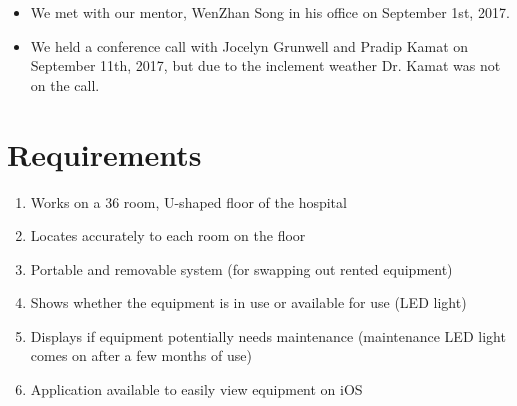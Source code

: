 \documentclass[12pt]{article}
\begin{document}
		\begin{itemize}
			\item We met with our mentor, WenZhan Song in his office on September 1st, 2017.\\
			\item We held a conference call with Jocelyn Grunwell and Pradip Kamat on September 11th, 2017, but due to the inclement weather Dr. Kamat was not on the call.\\
		\end{itemize}

\section{Requirements}
	\begin{enumerate}
		\item Works on a 36 room, U-shaped floor of the hospital
		\item Locates accurately to each room on the floor
		\item Portable and removable system (for swapping out rented equipment)
		\item Shows whether the equipment is in use or available for use (LED light)
		\item Displays if equipment potentially needs maintenance (maintenance LED light comes on after a few months of use) 
		\item Application available to easily view equipment on iOS
	\end{enumerate}
\end{document}
